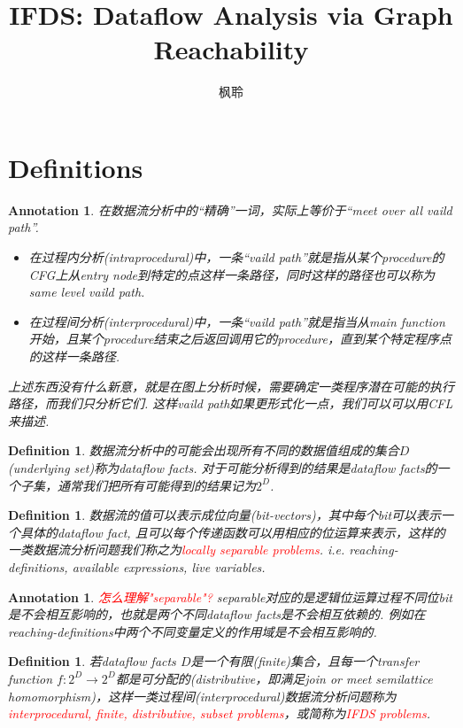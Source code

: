 \documentclass{article}
\newtheorem{definition}[theorem]{Definition}
\newtheorem{annotation}[theorem]{Annotation}
\newcommand*{\xfunc}[4]{{#2}\colon{#3}{#1}{#4}}
\newcommand*{\func}[3]{\xfunc{\to}{#1}{#2}{#3}}
\newcommand{\redt}[1]{\textcolor{red}{#1}}
\begin{document}
\title{IFDS: Dataflow Analysis via Graph Reachability}
\author{枫聆}
\maketitle
\tableofcontents

\newpage
\section{Definitions}


\begin{annotation}
\rm 在数据流分析中的“精确”一词，实际上等价于“meet over all vaild path”. 
\begin{itemize}
	\item 在过程内分析(intraprocedural)中，一条“vaild path”就是指从某个procedure的CFG上从entry node到特定的点这样一条路径，同时这样的路径也可以称为same level vaild path.  
	\item 在过程间分析(interprocedural)中，一条“vaild path”就是指当从main function开始，且某个procedure结束之后返回调用它的procedure，直到某个特定程序点的这样一条路径.  
\end{itemize}
上述东西没有什么新意，就是在图上分析时候，需要确定一类程序潜在可能的执行路径，而我们只分析它们. 这样vaild path如果更形式化一点，我们可以可以用CFL来描述. 
\end{annotation}

\begin{definition}
\rm 数据流分析中的可能会出现所有不同的数据值组成的集合$D$(underlying set)称为dataflow facts. 对于可能分析得到的结果是dataflow facts的一个子集，通常我们把所有可能得到的结果记为$2^D$. 
\end{definition}

\begin{definition}
\rm 数据流的值可以表示成位向量(bit-vectors)，其中每个bit可以表示一个具体的dataflow fact, 且可以每个传递函数可以用相应的位运算来表示，这样的一类数据流分析问题我们称之为\redt{locally separable problems}. i.e. reaching-definitions, available expressions, live variables. 
\end{definition}

\begin{annotation}
\rm \redt{怎么理解"separable"?} separable对应的是逻辑位运算过程不同位bit是不会相互影响的，也就是两个不同dataflow facts是不会相互依赖的. 例如在reaching-definitions中两个不同变量定义的作用域是不会相互影响的.   
\end{annotation}


\begin{definition}
\rm 若dataflow facts $D$是一个有限(finite)集合，且每一个transfer function $\func{f}{2^D}{2^D}$都是可分配的(distributive，即满足join or meet semilattice homomorphism)，这样一类过程间(interprocedural)数据流分析问题称为\redt{interprocedural, finite, distributive, subset problems}，或简称为\redt{IFDS problems}.
\end{definition}
\end{document}
